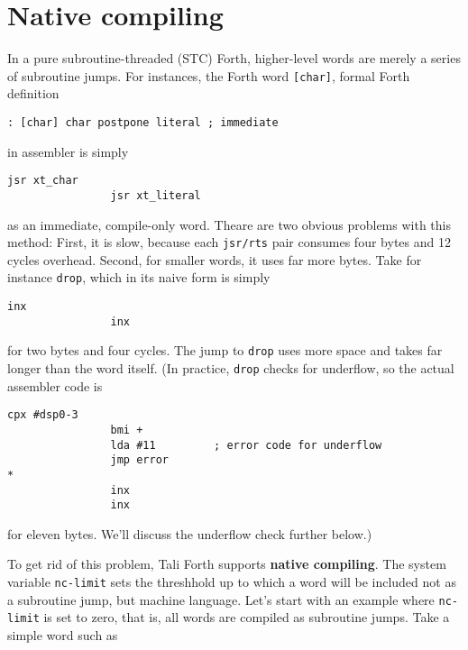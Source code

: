 
\section{Native compiling}

In a pure subroutine-threaded (STC) Forth, higher-level words are merely a
series of subroutine jumps. For instances, the Forth word \texttt{[char]},
formal Forth definition

\begin{lstlisting}[frame=single]
: [char] char postpone literal ; immediate
\end{lstlisting}

in assembler is simply

\begin{lstlisting}[frame=single]
                jsr xt_char
                jsr xt_literal
\end{lstlisting}

as an immediate, compile-only word. Theare are two obvious problems with this
method: First, it is slow, because each \texttt{jsr/rts} pair consumes four
bytes and 12 cycles overhead. Second, for smaller words, it uses far more bytes.
Take for instance \texttt{drop}, which in its naive
form is simply

\begin{lstlisting}[frame=single]
                inx
                inx
\end{lstlisting}

for two bytes and four cycles. The jump to \texttt{drop} uses more space and
takes far longer than the word itself. (In practice, \texttt{drop} checks for
underflow, so the actual assembler code is

\begin{lstlisting}[frame=single]
                cpx #dsp0-3
                bmi +
                lda #11         ; error code for underflow
                jmp error
*
                inx
                inx
\end{lstlisting}

for eleven bytes. We'll discuss the underflow check further below.)

To get rid of this problem, Tali Forth supports \textbf{native
compiling}. The system variable \texttt{nc-limit} sets
the threshhold up to which a word will be included not as a subroutine jump, but
machine language. Let's start with an example where \texttt{nc-limit} is set to
zero, that is, all words are compiled as subroutine jumps. Take a simple word
such as

